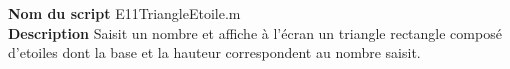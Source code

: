\textbf{Nom du script}
E11TriangleEtoile.m\\
\textbf{Description}
Saisit un nombre et affiche à l'écran un triangle rectangle composé d'etoiles dont la base et la hauteur correspondent au nombre saisit.